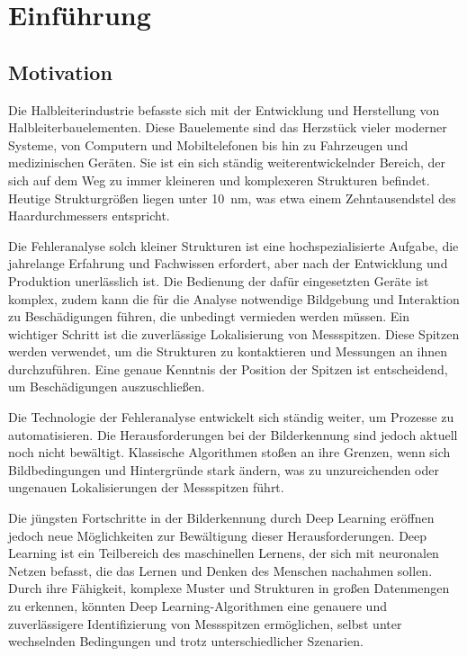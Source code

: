 \chapter{Einführung}
\section{Motivation}
Die Halbleiterindustrie befasste sich mit der Entwicklung und Herstellung von Halbleiterbauelementen. Diese Bauelemente sind das Herzstück vieler moderner Systeme, von Computern und Mobiltelefonen bis hin zu Fahrzeugen und medizinischen Geräten.
Sie ist ein sich ständig weiterentwickelnder Bereich, der sich auf dem Weg zu immer kleineren und komplexeren Strukturen befindet.
Heutige Strukturgrößen liegen unter \SI{10}{\nano\metre}, was etwa einem Zehntausendstel des Haardurchmessers entspricht.

Die Fehleranalyse solch kleiner Strukturen ist eine hochspezialisierte Aufgabe, die jahrelange Erfahrung und Fachwissen erfordert, aber nach der Entwicklung und Produktion unerlässlich ist.
Die Bedienung der dafür eingesetzten Geräte ist komplex, zudem kann die für die Analyse notwendige Bildgebung und Interaktion zu Beschädigungen führen, die unbedingt vermieden werden müssen.
Ein wichtiger Schritt ist die zuverlässige Lokalisierung von Messspitzen. Diese Spitzen werden verwendet, um die Strukturen zu kontaktieren und Messungen an ihnen durchzuführen. Eine genaue Kenntnis der Position der Spitzen ist entscheidend, um Beschädigungen auszuschließen.

Die Technologie der Fehleranalyse entwickelt sich ständig weiter, um Prozesse zu automatisieren. Die Herausforderungen bei der Bilderkennung sind jedoch aktuell noch nicht bewältigt. Klassische Algorithmen stoßen an ihre Grenzen, wenn sich Bildbedingungen und Hintergründe stark ändern, was zu unzureichenden oder ungenauen Lokalisierungen der Messspitzen führt.

Die jüngsten Fortschritte in der Bilderkennung durch Deep Learning eröffnen jedoch neue Möglichkeiten zur Bewältigung dieser Herausforderungen.
Deep Learning ist ein Teilbereich des maschinellen Lernens, der sich mit neuronalen Netzen befasst, die das Lernen und Denken des Menschen nachahmen sollen.
Durch ihre Fähigkeit, komplexe Muster und Strukturen in großen Datenmengen zu erkennen, könnten Deep Learning-Algorithmen eine genauere und zuverlässigere Identifizierung von Messspitzen ermöglichen, selbst unter wechselnden Bedingungen und trotz unterschiedlicher Szenarien.

